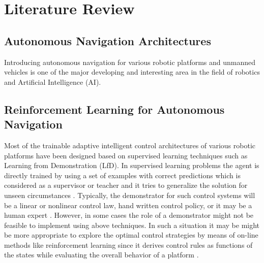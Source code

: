 \documentclass[a4paper,oneside,12pt]{report}
\begin{document}

\chapter{Literature Review}
\label{ch:litearure review}

\section{Autonomous Navigation Architectures}

Introducing autonomous navigation for various robotic platforms and unmanned vehicles is one of the major developing and interesting area in the field of robotics and Artificial Intelligence (AI). 

\section{Reinforcement Learning for Autonomous Navigation}
Most of the trainable adaptive intelligent control architectures of various robotic platforms have been designed based on supervised learning techniques such as Learning from Demonstration (LfD)\cite{R38}. In supervised learning problems the agent is directly trained by using a set of examples with correct predictions which is considered as a supervisor or teacher and it tries to generalize the solution for unseen circumstances \cite{R03}. Typically, the demonstrator for such control systems will be a linear or nonlinear control law, hand written control policy, or it may be a human expert \cite{R05} \cite{R23}.  However, in some cases the role of a demonstrator might not be feasible to implement using above techniques. In such a situation it may be might be more appropriate to explore the optimal control strategies by means of on-line methods like reinforcement learning since it derives control rules as functions of the states while evaluating the overall behavior of a platform \cite{R38}.
\end{document}
